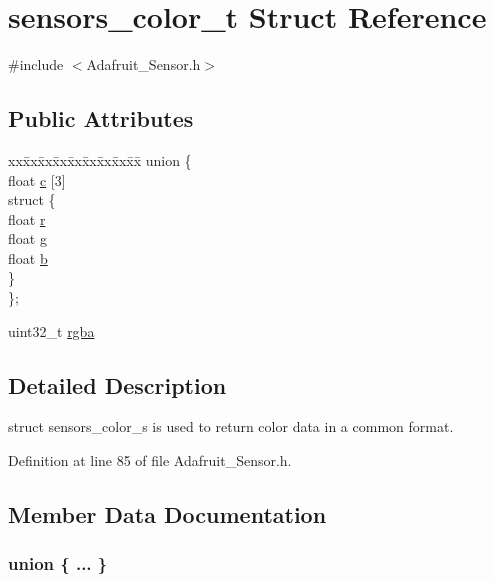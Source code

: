 \hypertarget{structsensors__color__t}{}\section{sensors\+\_\+color\+\_\+t Struct Reference}
\label{structsensors__color__t}


{\ttfamily \#include $<$Adafruit\+\_\+\+Sensor.\+h$>$}

\subsection*{Public Attributes}
\begin{DoxyCompactItemize}
\item 
\begin{tabbing}
xx\=xx\=xx\=xx\=xx\=xx\=xx\=xx\=xx\=\kill
union \{\\
\>float \hyperlink{structsensors__color__t_a4d76803c2e83303f611cf2a7910eaf17}{c} \mbox{[}3\mbox{]}\\
\>struct \{\\
\>\>float \hyperlink{structsensors__color__t_acdeed981e7df8c701e09d4b2fdb9a40c}{r}\\
\>\>float \hyperlink{structsensors__color__t_ac91ecea980718cf134f60c497d2a0049}{g}\\
\>\>float \hyperlink{structsensors__color__t_a1bf461b5c728e323f8883a3785c7c60b}{b}\\
\>\} \\
\}; \\

\end{tabbing}\item 
uint32\+\_\+t \hyperlink{structsensors__color__t_a0afbff980c17fbacdab1666735f3d3e6}{rgba}
\end{DoxyCompactItemize}


\subsection{Detailed Description}
struct sensors\+\_\+color\+\_\+s is used to return color data in a common format. 

Definition at line 85 of file Adafruit\+\_\+\+Sensor.\+h.



\subsection{Member Data Documentation}
\subsubsection[{\texorpdfstring{"@7}{@7}}]{\setlength{\rightskip}{0pt plus 5cm}union \{ ... \} }\hypertarget{structsensors__color__t_a713da7fcd97cbfeb045b7477716b730c}{}\label{structsensors__color__t_a713da7fcd97cbfeb045b7477716b730c}
